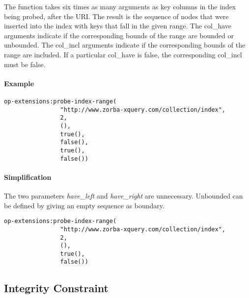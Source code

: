 \documentclass[]{article}
\begin{document}
\noindent
The function takes six times as many arguments as key columns in the index being probed, after the URI. The result is the sequence of nodes that were inserted into the index with keys that fall in the given range. The col\_have arguments indicate if the corresponding bounds of the range are bounded or unbounded. The col\_incl arguments indicate if the corresponding bounds of the range are included. If a particular col\_have is false, the corresponding col\_incl must be false.

\paragraph{Example}
\begin{verbatim}
op-extensions:probe-index-range(
                "http://www.zorba-xquery.com/collection/index",
                2,
                (),
                true(),
                false(),
                true(),
                false())
\end{verbatim}

\paragraph{Simplification}
The two parameters \textit{have\_left} and \textit{have\_right} are unnecessary. Unbounded can be defined by giving an empty sequence as boundary.

\begin{verbatim}
op-extensions:probe-index-range(
                "http://www.zorba-xquery.com/collection/index",
                2,
                (),
                true(),
                false())
\end{verbatim}

\subsection{Integrity Constraint}
\end{document}
